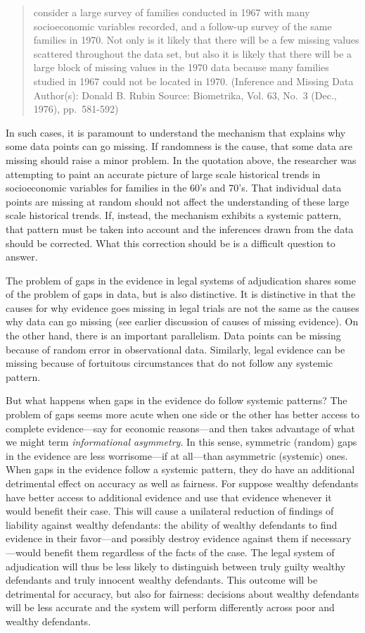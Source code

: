 \documentclass[
  10pt,
  dvipsnames,enabledeprecatedfontcommands]{scrartcl}
\begin{document}
\begin{quote}
consider a large survey of families conducted in 1967 with many
socioeconomic variables recorded, and a follow-up survey of the same
families in 1970. Not only is it likely that there will be a few missing
values scattered throughout the data set, but also it is likely that
there will be a large block of missing values in the 1970 data because
many families studied in 1967 could not be located in 1970. (Inference
and Missing Data Author(s): Donald B. Rubin Source: Biometrika, Vol. 63,
No.~3 (Dec., 1976), pp.~581-592)
\end{quote}

In such cases, it is paramount to understand the mechanism that explains
why some data points can go missing. If randomness is the cause, that
some data are missing should raise a minor problem. In the quotation
above, the researcher was attempting to paint an accurate picture of
large scale historical trends in socioeconomic variables for families in
the 60's and 70's. That individual data points are missing at random
should not affect the understanding of these large scale historical
trends. If, instead, the mechanism exhibits a systemic pattern, that
pattern must be taken into account and the inferences drawn from the
data should be corrected. What this correction should be is a difficult
question to answer.

The problem of gaps in the evidence in legal systems of adjudication
shares some of the problem of gaps in data, but is also distinctive. It
is distinctive in that the causes for why evidence goes missing in legal
trials are not the same as the causes why data can go missing (see
earlier discussion of causes of missing evidence). On the other hand,
there is an important parallelism. Data points can be missing because of
random error in observational data. Similarly, legal evidence can be
missing because of fortuitous circumstances that do not follow any
systemic pattern.

But what happens when gaps in the evidence do follow systemic patterns?
The problem of gaps seems more acute when one side or the other has
better access to complete evidence---say for economic reasons---and then
takes advantage of what we might term \textit{informational asymmetry}.
In this sense, symmetric (random) gaps in the evidence are less
worrisome---if at all---than asymmetric (systemic) ones. When gaps in
the evidence follow a systemic pattern, they do have an additional
detrimental effect on accuracy as well as fairness. For suppose wealthy
defendants have better access to additional evidence and use that
evidence whenever it would benefit their case. This will cause a
unilateral reduction of findings of liability against wealthy
defendants: the ability of wealthy defendants to find evidence in their
favor---and possibly destroy evidence against them if necessary---would
benefit them regardless of the facts of the case. The legal system of
adjudication will thus be less likely to distinguish between truly
guilty wealthy defendants and truly innocent wealthy defendants. This
outcome will be detrimental for accuracy, but also for fairness:
decisions about wealthy defendants will be less accurate and the system
will perform differently across poor and wealthy defendants.
\end{document}
